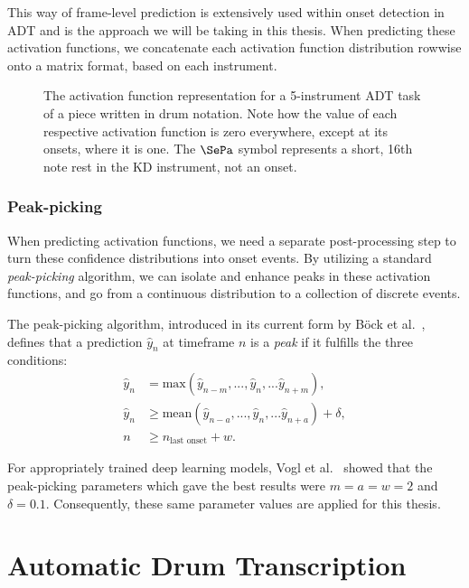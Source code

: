 This way of frame-level prediction is extensively used within onset detection in \gls{ADT} and is the approach we will be taking in this thesis. When predicting these activation functions, we concatenate each activation function distribution rowwise onto a matrix format, based on each instrument.

\begin{figure}[H]
    \centering
    \hspace*{-0.5cm}
    
    \caption{The activation function representation for a 5-instrument \gls{ADT} task of a piece written in drum notation. Note how the value of each respective activation function is zero everywhere, except at its onsets, where it is one. The $\SePa$ symbol represents a short, 16th note rest in the \gls{KD} instrument, not an onset.}
    \label{ActivationsFigure}
\end{figure}

\subsubsection{Peak-picking}

When predicting activation functions, we need a separate post-processing step to turn these confidence distributions into onset events. By utilizing a standard \textit{peak-picking} algorithm, we can isolate and enhance peaks in these activation functions, and go from a continuous distribution to a collection of discrete events.

The peak-picking algorithm, introduced in its current form by Böck et al.~\cite{Bck2012EvaluatingTO}, defines that a prediction $\hat{y}_n$ at timeframe $n$ is a \textit{peak} if it fulfills the three conditions:
\begin{align*} 
    \hat{y}_n &= \text{max}(\hat{y}_{n - m}, ..., \hat{y}_n, ... \hat{y}_{n + m}), \\ 
    \hat{y}_n &\ge \text{mean}(\hat{y}_{n - a}, ..., \hat{y}_n, ... \hat{y}_{n + a}) + \delta, \\
    n &\ge n_\text{last onset} + w.
\end{align*}

For appropriately trained deep learning models, Vogl et al.~\cite{vogl2018multiinstrumentdrumtranscription} showed that the peak-picking parameters which gave the best results were $m = a = w = 2$ and $\delta = 0.1$. Consequently, these same parameter values are applied for this thesis.


\section{Automatic Drum Transcription}

